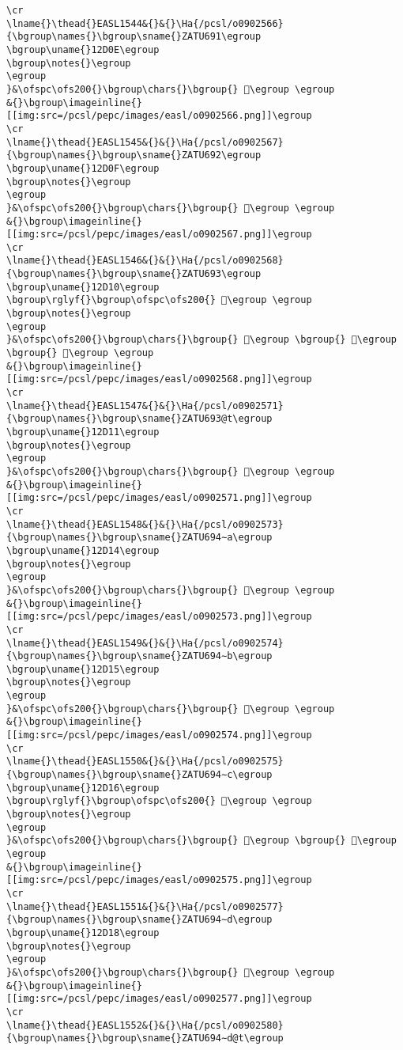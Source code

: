 \begin{verbatim}
\cr
\lname{}\thead{}EASL1544&{}&{}\Ha{/pcsl/o0902566}{\bgroup\names{}\bgroup\sname{}ZATU691\egroup
\bgroup\uname{}12D0E\egroup
\bgroup\notes{}\egroup
\egroup
}&\ofspc\ofs200{}\bgroup\chars{}\bgroup{} 𒴎\egroup \egroup
&{}\bgroup\imageinline{}[[img:src=/pcsl/pepc/images/easl/o0902566.png]]\egroup
\cr
\lname{}\thead{}EASL1545&{}&{}\Ha{/pcsl/o0902567}{\bgroup\names{}\bgroup\sname{}ZATU692\egroup
\bgroup\uname{}12D0F\egroup
\bgroup\notes{}\egroup
\egroup
}&\ofspc\ofs200{}\bgroup\chars{}\bgroup{} 𒴏\egroup \egroup
&{}\bgroup\imageinline{}[[img:src=/pcsl/pepc/images/easl/o0902567.png]]\egroup
\cr
\lname{}\thead{}EASL1546&{}&{}\Ha{/pcsl/o0902568}{\bgroup\names{}\bgroup\sname{}ZATU693\egroup
\bgroup\uname{}12D10\egroup
\bgroup\rglyf{}\bgroup\ofspc\ofs200{} 𒴐\egroup \egroup
\bgroup\notes{}\egroup
\egroup
}&\ofspc\ofs200{}\bgroup\chars{}\bgroup{} 𒴐\egroup \bgroup{} 𒴒\egroup \bgroup{} 𒴓\egroup \egroup
&{}\bgroup\imageinline{}[[img:src=/pcsl/pepc/images/easl/o0902568.png]]\egroup
\cr
\lname{}\thead{}EASL1547&{}&{}\Ha{/pcsl/o0902571}{\bgroup\names{}\bgroup\sname{}ZATU693@t\egroup
\bgroup\uname{}12D11\egroup
\bgroup\notes{}\egroup
\egroup
}&\ofspc\ofs200{}\bgroup\chars{}\bgroup{} 𒴑\egroup \egroup
&{}\bgroup\imageinline{}[[img:src=/pcsl/pepc/images/easl/o0902571.png]]\egroup
\cr
\lname{}\thead{}EASL1548&{}&{}\Ha{/pcsl/o0902573}{\bgroup\names{}\bgroup\sname{}ZATU694∼a\egroup
\bgroup\uname{}12D14\egroup
\bgroup\notes{}\egroup
\egroup
}&\ofspc\ofs200{}\bgroup\chars{}\bgroup{} 𒴔\egroup \egroup
&{}\bgroup\imageinline{}[[img:src=/pcsl/pepc/images/easl/o0902573.png]]\egroup
\cr
\lname{}\thead{}EASL1549&{}&{}\Ha{/pcsl/o0902574}{\bgroup\names{}\bgroup\sname{}ZATU694∼b\egroup
\bgroup\uname{}12D15\egroup
\bgroup\notes{}\egroup
\egroup
}&\ofspc\ofs200{}\bgroup\chars{}\bgroup{} 𒴕\egroup \egroup
&{}\bgroup\imageinline{}[[img:src=/pcsl/pepc/images/easl/o0902574.png]]\egroup
\cr
\lname{}\thead{}EASL1550&{}&{}\Ha{/pcsl/o0902575}{\bgroup\names{}\bgroup\sname{}ZATU694∼c\egroup
\bgroup\uname{}12D16\egroup
\bgroup\rglyf{}\bgroup\ofspc\ofs200{} 𒴖\egroup \egroup
\bgroup\notes{}\egroup
\egroup
}&\ofspc\ofs200{}\bgroup\chars{}\bgroup{} 𒴖\egroup \bgroup{} 𒴗\egroup \egroup
&{}\bgroup\imageinline{}[[img:src=/pcsl/pepc/images/easl/o0902575.png]]\egroup
\cr
\lname{}\thead{}EASL1551&{}&{}\Ha{/pcsl/o0902577}{\bgroup\names{}\bgroup\sname{}ZATU694∼d\egroup
\bgroup\uname{}12D18\egroup
\bgroup\notes{}\egroup
\egroup
}&\ofspc\ofs200{}\bgroup\chars{}\bgroup{} 𒴘\egroup \egroup
&{}\bgroup\imageinline{}[[img:src=/pcsl/pepc/images/easl/o0902577.png]]\egroup
\cr
\lname{}\thead{}EASL1552&{}&{}\Ha{/pcsl/o0902580}{\bgroup\names{}\bgroup\sname{}ZATU694∼d@t\egroup

\end{verbatim}
